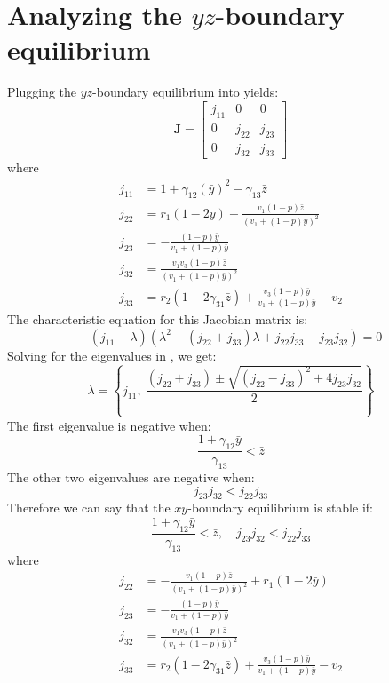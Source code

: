 \section{Analyzing the $yz$-boundary equilibrium}\label{sec:stability_yz_boundary_equilibrium}
Plugging the $yz$-boundary equilibrium into  yields:
\begin{equation}
    \textbf{J}=\begin{bmatrix}
        j_{11} & 0 & 0\\
        0 & j_{22} & j_{23}\\
        0 & j_{32} & j_{33}
    \end{bmatrix}
    \label{eq:5.14}
\end{equation}
where
\begin{align*}
    j_{11} &= 1+\gamma_{12}\left(\bar{y}\right)^2-\gamma_{13}\bar{z}\\
    j_{22} &= r_1\left(1-2\bar{y}\right)-\frac{v_1\left(1-p\right)\bar{z}}{\left(v_1+\left(1-p\right)\bar{y}\right)^2}\\
    j_{23} &= -\frac{\left(1-p\right)\bar{y}}{v_1+\left(1-p\right)\bar{y}}\\
    j_{32} &= \frac{v_1v_3\left(1-p\right)\bar{z}}{\left(v_1+\left(1-p\right)\bar{y}\right)^2}\\
    j_{33} &= r_2\left(1-2\gamma_{31}\bar{z}\right)+\frac{v_3\left(1-p\right)\bar{y}}{v_1+\left(1-p\right)\bar{y}}-v_2
\end{align*}
The characteristic equation for this Jacobian matrix is:
\begin{equation}
    -\left(j_{11}-\lambda\right)\left(\lambda^2-\left(j_{22}+j_{33}\right)\lambda+j_{22}j_{33}-j_{23}j_{32}\right)=0
    \label{eq:5.15}
\end{equation}
Solving for the eigenvalues in , we get:
\[
\lambda=\left\{
j_{11},\ 
\frac{\left(j_{22}+j_{33}\right)\pm\sqrt{\left(j_{22}-j_{33}\right)^2+4j_{23}j_{32}}}{2}
\right\}
\]
The first eigenvalue is negative when:
\[
\frac{1+\gamma_{12}\bar{y}}{\gamma_{13}}<\bar{z}
\]
The other two eigenvalues are negative when:
\[
j_{23}j_{32}<j_{22}j_{33}
\]
Therefore we can say that the $xy$-boundary equilibrium is stable if:
\[
\frac{1+\gamma_{12}\bar{y}}{\gamma_{13}}<\bar{z},\quad 
j_{23}j_{32}<j_{22}j_{33}
\]
where
\begin{align*}
    j_{22} &= -\frac{v_1\left(1-p\right)\bar{z}}{\left(v_1+\left(1-p\right)\bar{y}\right)^2}+r_1\left(1-2\bar{y}\right)\\
    j_{23} &= -\frac{\left(1-p\right)\bar{y}}{v_1+\left(1-p\right)\bar{y}}\\
    j_{32} &= \frac{v_1v_3\left(1-p\right)\bar{z}}{\left(v_1+\left(1-p\right)\bar{y}\right)^2}\\
    j_{33} &= r_2\left(1-2\gamma_{31}\bar{z}\right)+\frac{v_3\left(1-p\right)\bar{y}}{v_1+\left(1-p\right)\bar{y}}-v_2
\end{align*}

